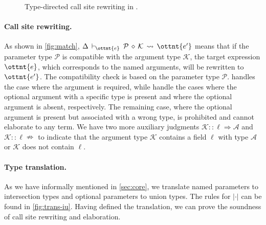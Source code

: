 \begin{figure}
\IUdefnpmatch{}
\IUdefnlookup{}
\IUdefnlookdown{}
\caption{Type-directed call site rewriting in \uaena.} \label{fig:match}
\end{figure}

\paragraph{Call site rewriting.}
As shown in \autoref{fig:match},
$ \Delta \,\vdash\, _{\!\!\!\! \ottnt{e} }\:\: \mathcal{P} \,\diamond\, \mathcal{K} \,\rightsquigarrow\, \ottnt{e'} $ means that if the parameter type
$\mathcal{P}$ is compatible with the argument type $\mathcal{K}$, the target expression
$\ottnt{e}$, which corresponds to the named arguments, will be rewritten to
$\ottnt{e'}$. The compatibility check is based on the parameter type $\mathcal{P}$.
 handles the case where the argument is required, while
 handle the cases where the optional argument
with a specific type is present and where the optional argument is absent,
respectively. The remaining case, where the optional argument is present but
associated with a wrong type, is prohibited and cannot elaborate to any term.
We have two more auxiliary judgments $ \mathcal{K} :: \ell \Rightarrow \mathcal{A} $ and
$ \mathcal{K} :: \ell \nRightarrow $ to indicate that the argument type $\mathcal{K}$ contains a field $\ell$
with type $\mathcal{A}$ or $\mathcal{K}$ does not contain $\ell$.

\paragraph{Type translation.}
As we have informally mentioned in \autoref{sec:core}, we translate named
parameters to intersection types and optional parameters to union types. The
rules for $|\cdot|$ can be found in \autoref{fig:trans-iu}. Having
defined the translation, we can prove the soundness of call site rewriting and
elaboration.

